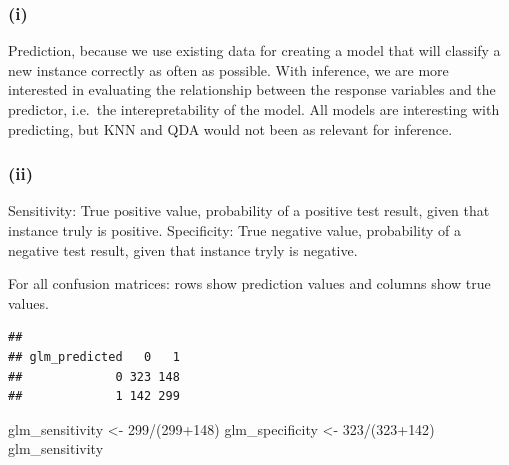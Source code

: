 \documentclass[
]{article}
\newenvironment{Shaded}{\begin{snugshade}}{\end{snugshade}}
\newcommand{\CommentTok}[1]{\textcolor[rgb]{0.56,0.35,0.01}{\textit{#1}}}
\newcommand{\DecValTok}[1]{\textcolor[rgb]{0.00,0.00,0.81}{#1}}
\newcommand{\FloatTok}[1]{\textcolor[rgb]{0.00,0.00,0.81}{#1}}
\newcommand{\FunctionTok}[1]{\textcolor[rgb]{0.00,0.00,0.00}{#1}}
\newcommand{\NormalTok}[1]{#1}
\newcommand{\OtherTok}[1]{\textcolor[rgb]{0.56,0.35,0.01}{#1}}
\newcommand{\SpecialCharTok}[1]{\textcolor[rgb]{0.00,0.00,0.00}{#1}}
\begin{document}
\hypertarget{i-4}{%
\subsubsection{(i)}\label{i-4}}

Prediction, because we use existing data for creating a model that will
classify a new instance correctly as often as possible. With inference,
we are more interested in evaluating the relationship between the
response variables and the predictor, i.e.~the interepretability of the
model. All models are interesting with predicting, but KNN and QDA would
not been as relevant for inference.

\hypertarget{ii-5}{%
\subsubsection{(ii)}\label{ii-5}}

Sensitivity: True positive value, probability of a positive test result,
given that instance truly is positive. Specificity: True negative value,
probability of a negative test result, given that instance tryly is
negative.

For all confusion matrices: rows show prediction values and columns show
true values.

\begin{Shaded}
\end{Shaded}

\begin{verbatim}
##              
## glm_predicted   0   1
##             0 323 148
##             1 142 299
\end{verbatim}

\begin{Shaded}
\begin{Highlighting}[]
\NormalTok{glm\_sensitivity }\OtherTok{\textless{}{-}} \DecValTok{299}\SpecialCharTok{/}\NormalTok{(}\DecValTok{299}\SpecialCharTok{+}\DecValTok{148}\NormalTok{)}
\NormalTok{glm\_specificity }\OtherTok{\textless{}{-}} \DecValTok{323}\SpecialCharTok{/}\NormalTok{(}\DecValTok{323}\SpecialCharTok{+}\DecValTok{142}\NormalTok{)}
\NormalTok{glm\_sensitivity}
\end{Highlighting}
\end{Shaded}
\end{document}
